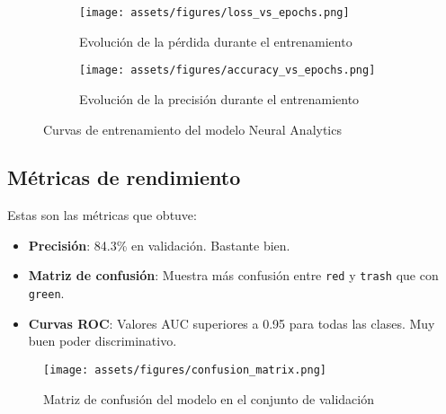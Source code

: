 \begin{figure}[ht]
    \centering
    \begin{subfigure}[b]{0.49\textwidth}
        \centering
        \texttt{[image: assets/figures/loss\_vs\_epochs.png]}
        \caption{Evolución de la pérdida durante el entrenamiento}
        \label{fig:loss_vs_epochs}
    \end{subfigure}
    \hfill
    \begin{subfigure}[b]{0.49\textwidth}
        \centering
        \texttt{[image: assets/figures/accuracy\_vs\_epochs.png]}
        \caption{Evolución de la precisión durante el entrenamiento}
        \label{fig:accuracy_vs_epochs}
    \end{subfigure}
    \caption{Curvas de entrenamiento del modelo Neural Analytics}
    \label{fig:training_curves}
\end{figure}

\newpage
\subsection{Métricas de rendimiento}

Estas son las métricas que obtuve:

\begin{itemize}
    \item \textbf{Precisión}: 84.3\% en validación. Bastante bien.
    
    \item \textbf{Matriz de confusión}: Muestra más confusión entre \texttt{red} y \texttt{trash} que con \texttt{green}.
    
    \item \textbf{Curvas ROC}: Valores AUC superiores a 0.95 para todas las clases. Muy buen poder discriminativo.
\end{itemize}

\begin{figure}[ht]
    \centering
    \texttt{[image: assets/figures/confusion\_matrix.png]}
    \caption{Matriz de confusión del modelo en el conjunto de validación}
    \label{fig:confusion_matrix}
\end{figure}

